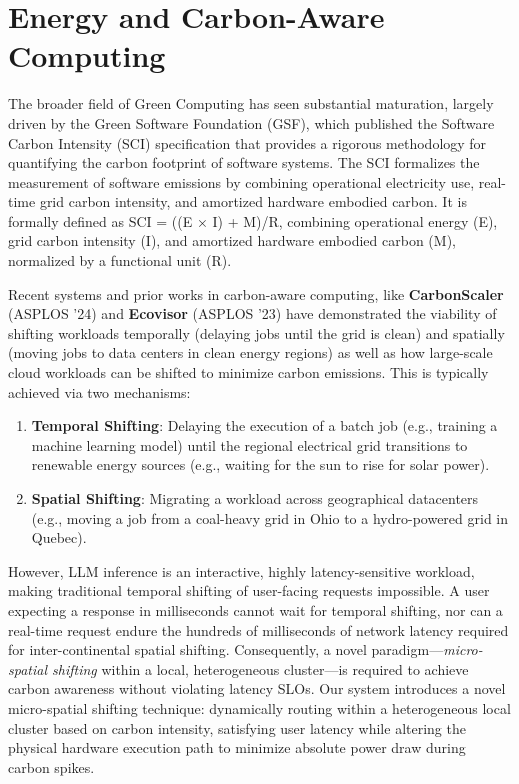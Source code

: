 \documentclass[12pt,a4paper,oneside]{report}
\begin{document}
\section{Energy and Carbon-Aware Computing}
\label{sec:lit_carbon_aware}

The broader field of Green Computing has seen substantial maturation, largely driven by the Green Software Foundation (GSF), which published the Software Carbon Intensity (SCI) specification that provides a rigorous methodology for quantifying the carbon footprint of software
systems. The SCI formalizes the measurement of software emissions by combining operational electricity use, real-time grid carbon intensity, and amortized hardware embodied carbon. It is formally defined as SCI = ((E × I) + M)/R, combining operational
energy (E), grid carbon intensity (I), and amortized hardware embodied carbon (M),
normalized by a functional unit (R).

Recent systems and prior works in carbon-aware computing, like \textbf{CarbonScaler} (ASPLOS '24) and \textbf{Ecovisor} (ASPLOS '23) have demonstrated the viability of shifting workloads temporally
(delaying jobs until the grid is clean) and spatially (moving jobs to data centers
in clean energy regions) as well as how large-scale cloud workloads can be shifted to minimize carbon emissions. This is typically achieved via two mechanisms:
\begin{enumerate}
    \item \textbf{Temporal Shifting}: Delaying the execution of a batch job (e.g., training a machine learning model) until the regional electrical grid transitions to renewable energy sources (e.g., waiting for the sun to rise for solar power).
    \item \textbf{Spatial Shifting}: Migrating a workload across geographical datacenters (e.g., moving a job from a coal-heavy grid in Ohio to a hydro-powered grid in Quebec).
\end{enumerate}

However, LLM inference is an interactive, highly latency-sensitive workload, making
traditional temporal shifting of user-facing requests impossible. A user expecting a response in milliseconds cannot wait for temporal shifting, nor can a real-time request endure the hundreds of milliseconds of network latency required for inter-continental spatial shifting. Consequently, a novel paradigm—\textit{micro-spatial shifting} within a local, heterogeneous cluster—is required to achieve carbon awareness without violating latency SLOs. Our system introduces
a novel micro-spatial shifting technique: dynamically routing within a heterogeneous local
cluster based on carbon intensity, satisfying user latency while altering the physical
hardware execution path to minimize absolute power draw during carbon spikes. 
\end{document}
